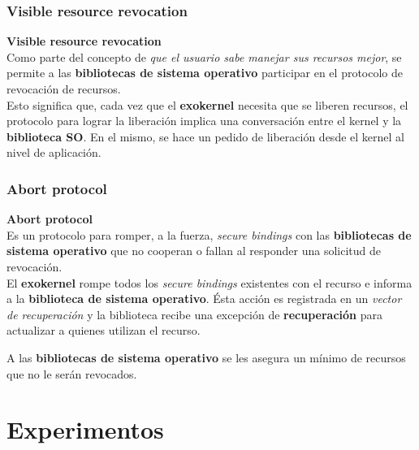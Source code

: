\documentclass[10pt]{beamer}
\begin{document}
\subsubsection{Visible resource revocation}

\begin{frame}
\textbf{Visible resource revocation} \\[2em]

Como parte del concepto de \emph{que el usuario sabe manejar sus recursos mejor}, se permite a las \textbf{bibliotecas de sistema operativo} participar en el protocolo de revocación de recursos.\\[1em]

Esto significa que, cada vez que el \textbf{exokernel} necesita que se liberen recursos, el protocolo para lograr la liberación implica una conversación entre el kernel y la \textbf{biblioteca SO}. En el mismo, se hace un pedido de liberación desde el kernel al nivel de aplicación.

\end{frame}


\subsubsection{Abort protocol}

\begin{frame}
\textbf{Abort protocol} \\[2em]

Es un protocolo para romper, a la fuerza, \textit{secure bindings} con las \textbf{bibliotecas de sistema operativo} que no cooperan o fallan al responder una solicitud de revocación.\\[1em]

El \textbf{exokernel} rompe todos los \textit{secure bindings} existentes con el recurso e informa a la \textbf{biblioteca de sistema operativo}. Ésta acción es registrada en un \textit{vector de recuperación} y la biblioteca recibe una excepción de \textbf{recuperación} para actualizar a quienes utilizan el recurso.

A las \textbf{bibliotecas de sistema operativo} se les asegura un mínimo de recursos que no le serán revocados. 

\end{frame}


\section{Experimentos}
\end{document}
